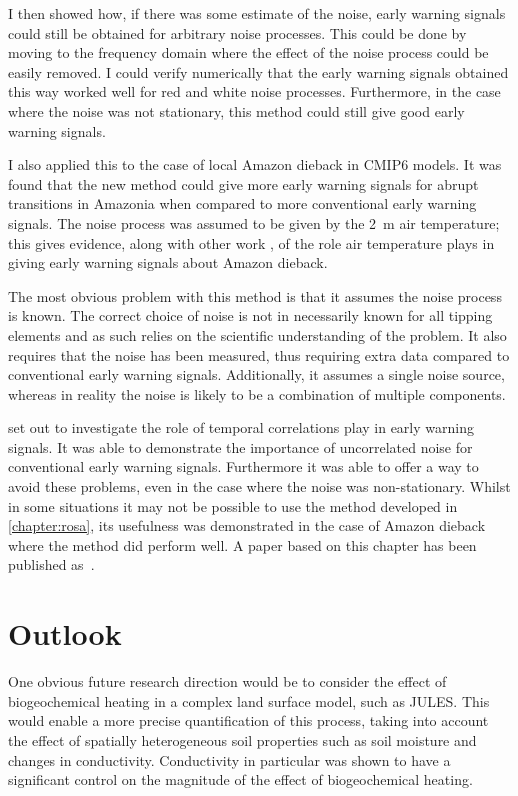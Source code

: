 I then showed how, if there was some estimate of the noise, early warning signals could still be obtained for arbitrary noise processes. This could be done by moving to the frequency domain
where the effect of the noise process could be easily removed. I could verify numerically that the early warning signals obtained this way worked well for red and white noise processes.
Furthermore, in the case where the noise was not stationary, this method could still give good early warning signals.

I also applied this to the case of local Amazon dieback in CMIP6 models. It was found that the new method could give more early warning signals for abrupt transitions in Amazonia
when compared to more conventional early warning signals. The noise process was assumed to be given by the \SI{2}{\meter} air temperature; this gives evidence, along with
other work \parencite{Parry2022,Ritchie2022}, of the role air temperature plays in giving early warning signals about Amazon dieback.

The most obvious problem with this method is that it assumes the noise process is known. The correct choice of noise is not in necessarily known for all
tipping elements and as such relies on the scientific understanding of the problem. It also requires that the noise has been measured, thus requiring extra data compared to
conventional early warning signals. Additionally, it assumes a single noise source, whereas in reality the noise is likely to be a combination of multiple components.

 set out to investigate the role of temporal correlations play in early warning signals. It was able to demonstrate the importance of uncorrelated noise
for conventional early warning signals. Furthermore it was able to offer a way to avoid these problems, even in the case where the noise was non-stationary.
Whilst in some situations it may not be possible to use the method developed in \cref{chapter:rosa}, its usefulness was demonstrated in the case of Amazon dieback
where the method did perform well. A paper based on this chapter has been published as~\cite{Clarke2023}.


\section{Outlook}
One obvious future research direction would be to consider the effect of biogeochemical heating in a complex land surface model, such as JULES.
This would enable a more precise quantification of this process, taking into account the effect of spatially heterogeneous soil properties such as
soil moisture and changes in conductivity. Conductivity in particular was shown to have a significant control on the magnitude of the effect of biogeochemical heating.

